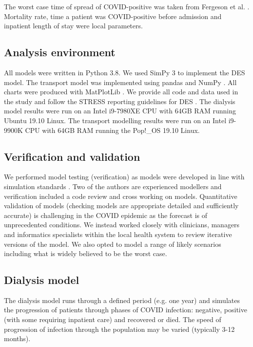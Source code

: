 \begin{multicols}{2}
The worst case time of spread of COVID-positive was taken from Fergeson et al. \cite{ferguson_impact_2020}. Mortality rate, time a patient was COVID-positive before admission and inpatient length of stay were local parameters.

\subsection{Analysis environment}
All models were written in Python 3.8. We used SimPy 3 \cite{simpy} to implement the DES model. The transport model was implemented using pandas \cite{mckinney2011pandas} and NumPy \cite{numpy}.  All charts were produced with MatPlotLib \cite{Hunter:2007}. We provide all code and data used in the study and follow the STRESS reporting guidelines for DES \cite{Monks2019}. 
The dialysis model results were run on an Intel i9-7980XE CPU with 64GB RAM running Ubuntu 19.10 Linux. The transport modelling results were run on an Intel i9-9900K CPU with 64GB RAM running the Pop!\_OS 19.10 Linux.

\subsection{Verification and validation}
We performed model testing (verification) as models were developed in line with simulation standards \cite{sargent2010}. Two of the authors are experienced modellers and verification included a code review and cross working on models. Quantitative validation of models (checking models are appropriate detailed and sufficiently accurate) is challenging in the COVID epidemic as the forecast is of unprecedented conditions. We instead worked closely with clinicians, managers and informatics specialists within the local health system to review iterative versions of the model.  We also opted to model a range of likely scenarios including what is widely believed to be the worst case.


\subsection{Dialysis model}
The dialysis model runs through a defined period (e.g. one year) and simulates the progression of patients through phases of COVID infection: negative, positive (with some requiring inpatient care) and recovered or died. The speed of progression of infection through the population may be varied (typically 3-12 months).


\end{multicols}
